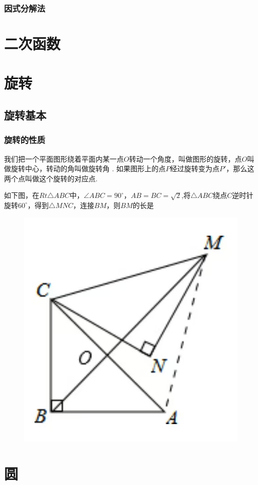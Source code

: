 \documentclass[lang=cn, 10pt, titlestyle=hang]{elegantbook}
\begin{document}
\subsection{因式分解法}

\chapter{二次函数}

\chapter{旋转}

\section{旋转基本}

\subsection{旋转的性质}

我们把一个平面图形绕着平面内某一点\(O \)转动一个角度，叫做图形的旋转，点\(O \)叫做旋转中心，转动的角叫做旋转角 . 如果图形上的点\(P \)经过旋转变为点\(P' \)，那么这两个点叫做这个旋转的对应点.

\begin{example}
    如下图，在\(Rt\triangle ABC \)中，\(\angle ABC = 90^\circ \)，\(AB=BC=\sqrt{2}\),将\(\triangle ABC\)绕点\(C\)逆时针旋转\(60^\circ\)，得到\(\triangle MNC\)，连接\(BM\)，则\(BM\)的长是 \underline{\hspace{3em}}
    
\begin{figure}[h]
    \raggedright
    \includegraphics[width=0.25\linewidth]{figure/example_rotation1.jpg}
    
    \label{fig:enter-label}
\end{figure}
    
\end{example}



\chapter{圆}
\end{document}

